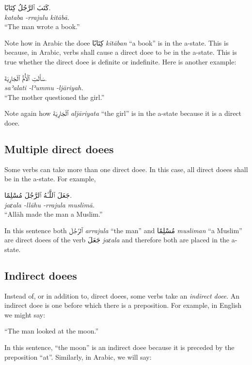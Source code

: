 \documentclass[
  10pt,
]{book}
\begin{document}
\foreignlanguage{arabic}{کَتَبَ ٱلرَّجُلُ کِتَابًا.}\\
\emph{kataba -rrajulu kitābā.}\\
\enquote{The man wrote a book.}

Note how in Arabic the doee \foreignlanguage{arabic}{کِتَابًا} \emph{kitāban} \enquote{a book} is in the a-state. This is because, in Arabic, verbs shall cause a direct doee to be in the a-state. This is true whether the direct doee is definite or indefinite. Here is another example:

\foreignlanguage{arabic}{سَأَلَتِ ٱلْأُمُّ ٱلْجَارِيَةَ.}\\
\emph{saʾalati -lʾummu -ljāriyah.}\\
\enquote{The mother questioned the girl.}

Note again how \foreignlanguage{arabic}{ٱلْجَارِيَةَ} \emph{aljāriyata} \enquote{the girl} is in the a-state because it is a direct doee.

\subsection{Multiple direct doees}\label{multiple-direct-doees}

Some verbs can take more than one direct doee. In this case, all direct doees shall be in the a-state. For example,

\foreignlanguage{arabic}{جَعَلَ ٱللَّـٰهُ ٱلرَّجُلَ مُسْلِمًا.}\\
\emph{jaɛala -llāhu -rrajula muslimā.}\\
\enquote{Allāh made the man a Muslim.}

In this sentence both \foreignlanguage{arabic}{ٱلرَّجُلَ} \emph{arrajula} \enquote{the man} and \foreignlanguage{arabic}{مُسْلِمًا} \emph{musliman} \enquote{a Muslim} are direct doees of the verb \foreignlanguage{arabic}{جَعَلَ} \emph{jaɛala} and therefore both are placed in the a-state.

\subsection{Indirect doees}\label{indirect-doees}

Instead of, or in addition to, direct doees, some verbs take an \emph{indirect doee}. An indirect doee is one before which there is a preposition. For example, in English we might say:

\enquote{The man looked at the moon.}

In this sentence, \enquote{the moon} is an indirect doee because it is preceded by the preposition \enquote{at}. Similarly, in Arabic, we will say:
\end{document}
